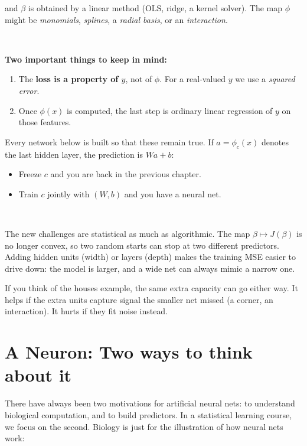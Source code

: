 \documentclass[
]{book}
\begin{document}
and \(\beta\) is obtained by a linear method (OLS, ridge, a kernel solver). The map \(\phi\) might be \emph{monomials}, \emph{splines}, a \emph{radial basis}, or an \emph{interaction}.

~

\textbf{Two important things to keep in mind:}

\begin{enumerate}
\def\labelenumi{\arabic{enumi}.}
\item
  The \textbf{loss is a property of \(y\)}, not of \(\phi\). For a real-valued \(y\) we use a \emph{squared error}.
\item
  Once \(\phi(x)\) is computed, the last step is ordinary linear regression of \(y\) on those features.
\end{enumerate}

Every network below is built so that these remain true. If \(a=\phi_c(x)\) denotes the last hidden layer, the prediction is \(W a+b\):

\begin{itemize}
\item
  Freeze \(c\) and you are back in the previous chapter.
\item
  Train \(c\) jointly with \((W,b)\) and you have a neural net.
\end{itemize}

~

The new challenges are statistical as much as algorithmic. The map \(\beta\mapsto J(\beta)\) is no longer convex, so two random starts can stop at two different predictors. Adding hidden units (width) or layers (depth) makes the training MSE easier to drive down: the model is larger, and a wide net can always mimic a narrow one.

If you think of the houses example, the same extra capacity can go either way. It helps if the extra units capture signal the smaller net missed (a corner, an interaction). It hurts if they fit noise instead.

\section{A Neuron: Two ways to think about it}\label{a-neuron-two-ways-to-think-about-it}

There have always been two motivations for artificial neural nets: to understand biological computation, and to build predictors. In a statistical learning course, we focus on the second. Biology is just for the illustration of how neural nets work:
\end{document}
